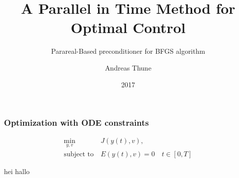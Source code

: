 \documentclass{beamer}
\title{A Parallel in Time Method for Optimal Control}
\subtitle{Parareal-Based preconditioner for BFGS algorithm}
\author{Andreas Thune}
\date{2017}
\begin{document}
 
\frame{\titlepage}
 
\begin{frame}
\frametitle{Optimization with ODE constraints}

\begin{align*}
\min_{y,v} &J(y(t),v), \\
\textrm{subject to} \ &E(y(t),v)=0\quad t\in[0,T]
\end{align*}
\end{frame}
\begin{frame}
hei hallo
\end{frame}
 
\end{document}
